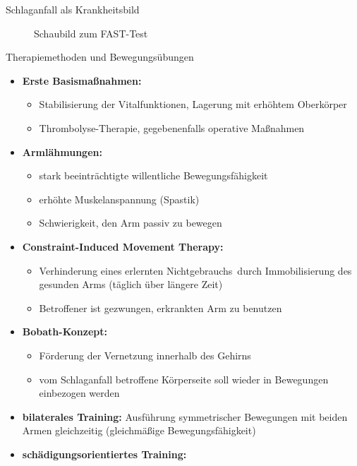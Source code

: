 \documentclass[final,20pt]{beamer}
\newlength{\colwidth}
\begin{document}
\begin{frame}[t]
\begin{columns}[t]
\begin{column}{\colwidth}
\begin{alertblock}{Schlaganfall als Krankheitsbild}
  	\begin{figure}[H]
  		\centering
  		
  		\caption{Schaubild zum FAST-Test}
  		\label{fig:fasttest}
  	\end{figure}

  \end{alertblock}

  \begin{alertblock}{Therapiemethoden und Bewegungsübungen}

    \begin{itemize}
      \item \textbf{Erste Basismaßnahmen:}
      \begin{itemize}
      	\item Stabilisierung der Vitalfunktionen, Lagerung mit erhöhtem Oberkörper
      	\item Thrombolyse-Therapie, gegebenenfalls operative Maßnahmen
      \end{itemize}
	  \item \textbf{Armlähmungen:}
	  \begin{itemize}
	  	\item stark beeinträchtigte willentliche Bewegungsfähigkeit
	  	\item erhöhte Muskelanspannung (Spastik)
	  	\item Schwierigkeit, den Arm passiv zu bewegen
	  \end{itemize}
  	  \item \textbf{Constraint-Induced Movement Therapy:}
  	  \begin{itemize}
  	  	\item Verhinderung eines \glqq erlernten Nichtgebrauchs\grqq ~durch Immobilisierung des gesunden Arms (täglich über längere Zeit)
  	  	\item Betroffener ist gezwungen, erkrankten Arm zu benutzen
  	  \end{itemize}
	 \item \textbf{Bobath-Konzept:}
	 \begin{itemize}
	    	\item Förderung der Vernetzung innerhalb des Gehirns
	    	\item vom Schlaganfall betroffene Körperseite soll wieder in Bewegungen einbezogen werden
	 \end{itemize}
 	\item \textbf{bilaterales Training:} Ausführung symmetrischer Bewegungen mit beiden Armen gleichzeitig (gleichmäßige Bewegungsfähigkeit)
 	\item \textbf{schädigungsorientiertes Training:}

\end{itemize}
\end{alertblock}
\end{column}
\end{columns}
\end{frame}
\end{document}
